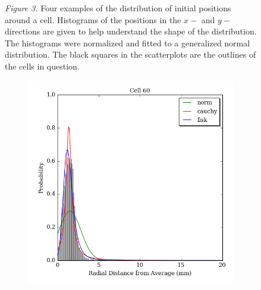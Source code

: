 \documentclass[12pt]{article}
\begin{document}
\begin{figure}
\begin{subfigure}{.5\textwidth}
  \label{fig:sub2}
\end{subfigure}
\label{fig:test}
\textit{Figure 3.} Four examples of the distribution of initial positions around a cell. Histograms of the positions in the $x-$ and $y-$directions are given to help understand the shape of the distribution. The histograms were normalized and fitted to a generalized normal distribution. The black squares in the scatterplots are the outlines of the cells in question.
\end{figure}

\begin{figure}
\centering
\begin{subfigure}{.5\textwidth}
  \centering
  \includegraphics[width=\linewidth]{../figures/cellfigs/probdens60.png}
  \label{fig:sub1}
\end{subfigure}%
\begin{subfigure}{.5\textwidth}
  \centering

\end{subfigure}
\end{figure}
\end{document}
